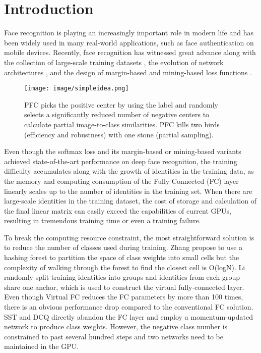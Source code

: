 \documentclass[10pt,twocolumn,letterpaper]{article}
\begin{document}
\section{Introduction}

Face recognition is playing an increasingly important role in modern life and has been widely used in many real-world applications, such as face authentication on mobile devices.
Recently, face recognition has witnessed great advance along with the collection of large-scale training datasets \cite{cao2018vggface2,zhu2021webface260m}, the evolution of network architectures \cite{schroff2015facenet,he2016deep}, and the design of margin-based and mining-based loss functions \cite{schroff2015facenet,liu2017sphereface,tencent2018CosineFace,wang2018additive,deng2019arcface,wang2019mis,huang2020curricularface,xu2021consistent}.

\begin{figure}
\centering
\texttt{[image: image/simpleidea.png]}
\vspace{-2mm}
\caption{PFC picks the positive center by using the label and randomly selects a significantly reduced number of negative centers to calculate partial image-to-class similarities. PFC kills two birds (efficiency and robustness) with one stone (partial sampling). }
\vspace{-4mm}
\label{fig:simpleidea}
\end{figure}

Even though the softmax loss \cite{cao2018vggface2} and its margin-based \cite{liu2017sphereface,tencent2018CosineFace,wang2018additive,deng2019arcface} or mining-based \cite{wang2019mis,huang2020curricularface,xu2021consistent} variants achieved state-of-the-art performance on deep face recognition, the training difficulty accumulates along with the growth of identities in the training data, as the memory and computing consumption of the Fully Connected (FC) layer linearly scales up to the number of identities in the training set. When there are large-scale identities in the training dataset, the cost of storage and calculation of the final linear matrix can easily exceed the capabilities of current GPUs, resulting in tremendous training time or even a training failure.

To break the computing resource constraint, the most straightforward solution is to reduce the number of classes used during training. Zhang \etal \cite{zhang2018accelerated} propose to use a hashing forest to partition the space of class weights into small cells but the complexity of walking through the forest to find the closest cell is O(logN). Li \etal \cite{li2021virtual} randomly split training identities into groups and identities from each group share one anchor, which is used to construct the virtual fully-connected layer. Even though Virtual FC reduces the FC parameters by more than 100 times, there is an obvious performance drop compared to the conventional FC solution. SST \cite{du2020semi} and DCQ \cite{bi2021dcq} directly abandon the FC layer and employ a momentum-updated network to produce class weights. However, the negative class number is constrained to past several hundred steps and two networks need to be maintained in the GPU.
\end{document}
